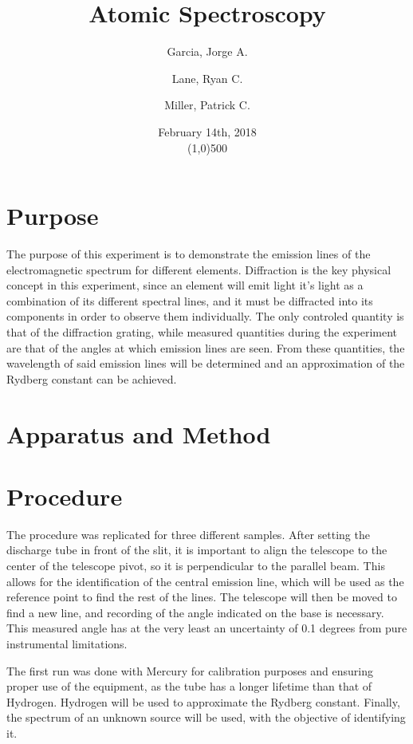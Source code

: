 \documentclass[a4paper, twocolumn]{article}
\title{Atomic Spectroscopy}
\author{
Garcia, Jorge A.\\
\and
Lane, Ryan C. \\
\and
Miller, Patrick C.
}
\date{February 14th, 2018\\\line(1,0){500}}
\begin{document}
\maketitle

\section{Purpose}
The purpose of this experiment is to demonstrate the emission lines of the electromagnetic spectrum for different elements.
Diffraction is the key physical concept in this experiment, since an element will emit light it's light as a combination of
its different spectral lines, and it must be diffracted into its components in order to observe them individually. The only
controled quantity is that of the diffraction grating, while measured quantities during the experiment are that of the 
angles at which emission lines are seen. From these quantities, the wavelength of said emission lines will be determined and
an approximation of the Rydberg constant can be achieved.

\section{Apparatus and Method}


\section{Procedure}
The procedure was replicated for three different samples. After setting the discharge tube in front of the slit, it is important
to align the telescope to the center of the telescope pivot, so it is perpendicular to the parallel beam. This allows for the 
identification of the central emission line, which will be used as the reference point to find the rest of the lines. The telescope
will then be moved to find a new line, and recording of the angle indicated on the base is necessary. This measured angle has
at the very least an uncertainty of 0.1 degrees from pure instrumental limitations.

The first run was done with Mercury for calibration purposes and ensuring proper use of the equipment, as the tube has a longer
lifetime than that of Hydrogen. Hydrogen will be used to approximate the Rydberg constant. Finally, the spectrum of an unknown source
will be used, with the objective of identifying it.
\end{document}
